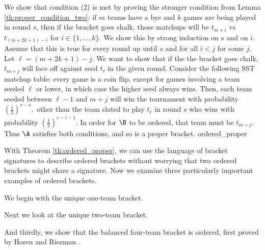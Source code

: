 {{    We show that condition (2) is met by proving the stronger condition from Lemma \ref{th:proper_condition_two}: if $m$ teams have a bye and $k$ games are being played in round $s$, then if the bracket goes chalk, those matchups will be $t_{m + i}$ vs $t_{(m + 2k + 1) - i}$ for $i \in \{1, ..., k\}.$ We show this by strong induction on $s$ and on $i$.\\

    Assume that this is true for every round up until $s$ and for all $i < j$ for some $j$. Let $\ell = (m + 2k + 1) - j.$ We want to show that if the the bracket goes chalk, $t_{m + j}$ will face off against seed $t_{\ell}$ in the given round. Consider the following SST matchup table: every game is a coin flip, except for games involving a team seeded $\ell$ or lower, in which case the higher seed always wins. Then, each team seeded between $\ell - 1$ and $m + j$ will win the tournament with probability $(\frac{1}{2})^{r-s},$ other than the team slated to play $t_\ell$ in round $s$ who wins with probability $(\frac{1}{2})^{r-i-1}.$ In order for $\B$ to be ordered, that team must be $t_{m+j}.$\\

    Thus $\A$ satisfies both conditions, and so is a proper bracket.
}{ordered_proper}

With Theorem \ref{th:ordered_proper}, we can use the language of bracket signatures to describe ordered brackets without worrying that two ordered brackets might share a signature. Now we examine three particularly important examples of ordered brackets.

We begin with the unique one-team bracket.


Next we look at the unique two-team bracket.


And thirdly, we show that the balanced four-team bracket is ordered, first proved by Horen and Riezman \cite{four_eight_ordered}.

}
